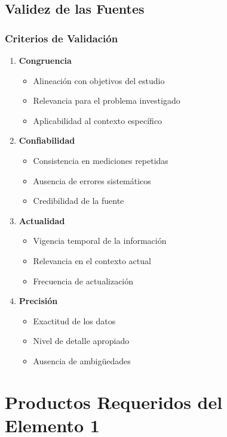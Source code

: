\documentclass[12pt,letterpaper,oneside]{book}
\begin{document}
\subsection{Validez de las Fuentes}

\subsubsection{Criterios de Validación}

\begin{enumerate}
\item \textbf{Congruencia}
   \begin{itemize}
   \item Alineación con objetivos del estudio
   \item Relevancia para el problema investigado
   \item Aplicabilidad al contexto específico
   \end{itemize}

\item \textbf{Confiabilidad}
   \begin{itemize}
   \item Consistencia en mediciones repetidas
   \item Ausencia de errores sistemáticos
   \item Credibilidad de la fuente
   \end{itemize}

\item \textbf{Actualidad}
   \begin{itemize}
   \item Vigencia temporal de la información
   \item Relevancia en el contexto actual
   \item Frecuencia de actualización
   \end{itemize}

\item \textbf{Precisión}
   \begin{itemize}
   \item Exactitud de los datos
   \item Nivel de detalle apropiado
   \item Ausencia de ambigüedades
   \end{itemize}
\end{enumerate}

\section{Productos Requeridos del Elemento 1}
\end{document}
